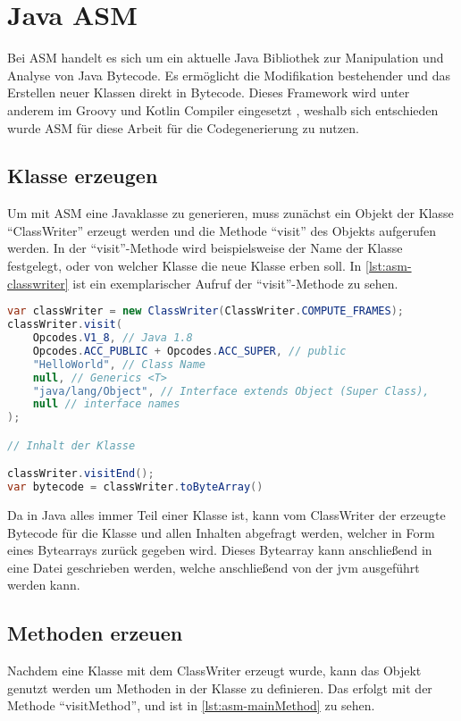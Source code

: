 \section{Java ASM}
Bei ASM handelt es sich um ein aktuelle Java Bibliothek zur Manipulation und Analyse von Java Bytecode. Es ermöglicht die Modifikation bestehender und das Erstellen neuer Klassen direkt in Bytecode. Dieses Framework wird unter anderem im Groovy und Kotlin Compiler eingesetzt \cite{Bruneton2022}, weshalb sich entschieden wurde ASM für diese Arbeit für die Codegenerierung zu nutzen.

\subsection{Klasse erzeugen}
Um mit ASM eine Javaklasse zu generieren, muss zunächst ein Objekt der Klasse \enquote{ClassWriter} erzeugt werden und die Methode \enquote{visit} des Objekts aufgerufen werden. In der \enquote{visit}-Methode wird beispielsweise der Name der Klasse festgelegt, oder von welcher Klasse die neue Klasse erben soll. In \cref{lst:asm-classwriter} ist ein exemplarischer Aufruf der \enquote{visit}-Methode zu sehen. 

\begin{lstlisting}[language=Java, caption=Erzeugung und Nutzung eines ClassWriters, label={lst:asm-classwriter}]
var classWriter = new ClassWriter(ClassWriter.COMPUTE_FRAMES);
classWriter.visit(
	Opcodes.V1_8, // Java 1.8
	Opcodes.ACC_PUBLIC + Opcodes.ACC_SUPER, // public
	"HelloWorld", // Class Name
	null, // Generics <T>
	"java/lang/Object", // Interface extends Object (Super Class),
	null // interface names
);

// Inhalt der Klasse

classWriter.visitEnd();
var bytecode = classWriter.toByteArray()

\end{lstlisting}

Da in Java alles immer Teil einer Klasse ist, kann vom ClassWriter der erzeugte Bytecode für die Klasse und allen Inhalten abgefragt werden, welcher in Form eines Bytearrays zurück gegeben wird. Dieses Bytearray kann anschließend in eine Datei geschrieben werden, welche anschließend von der \ac{jvm} ausgeführt werden kann.

\subsection{Methoden erzeuen}
Nachdem eine Klasse mit dem ClassWriter erzeugt wurde, kann das Objekt genutzt werden um Methoden in der Klasse zu definieren. Das erfolgt mit der Methode \enquote{visitMethod}, und ist in \cref{lst:asm-mainMethod} zu sehen.

